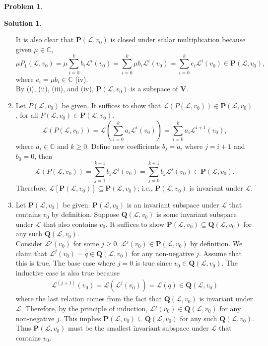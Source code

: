 \documentclass{article}
\theoremstyle{definition}
\newtheorem*{prob*}{Problem}
\newtheorem*{sln*}{Solution}
\newcommand{\V}{\mathbf{V}}
\newcommand{\lag}{\mathcal{L}}
\begin{document}
\begin{prob*}
\begin{sln*}
\begin{enumerate}
			It is also clear that $\mathbf{P}(\lag,v_0)$ is closed under scalar multiplication because given $\mu\in \mathbb{C}$, $$\mu P_1(\lag,v_0) = \mu\sum_{i=0}^kb_i\lag^i(v_0) = \sum_{i=0}^k\mu b_i\lag^i(v_0) = \sum_{i=0}^ke_i\lag^i(v_0) \in \mathbf{P}(\lag,v_0),$$ where $e_i = \mu b_i \in \mathbb{C}$ (iv).\\
			
			By (i), (ii), (iii), and (iv), $\mathbf{P}(\lag,v_0)$ is a subspace of $\V$. \\
			
			
			\item Let $P(\lag,v_0)$ be given. It suffices to show that $\lag(P(\lag, v_0)) \in \mathbf{P}(\lag,v_0)$, for all $P(\lag,v_0) \in \mathbf{P}(\lag,v_0)$. $$ \lag(P(\lag,v_0)) = \lag\left( \sum_{i=0}^k a_i\lag^i(v_0) \right) = \sum_{i=0}^k a_i \lag^{i+1}(v_0),$$ where $a_i\in\mathbb{C}$ and $k\geq 0$. Define new coefficients $b_{j} = a_{i}$ where $j=i+1$ and $b_0 = 0$, then $$ \lag(P(\lag,v_0)) = \sum_{j=1}^{k+1} b_j\lag^j(v_0) = \sum_{j=0}^{k+1} b_j\lag^j(v_0) \in \mathbf{P}(\lag,v_0). $$
			Therefore, $\lag\left[\mathbf{P}(\lag,v_0) \right] \subseteq \mathbf{P}(\lag,v_0)$; i.e., $\mathbf{P}(\lag,v_0)$ is invariant under $\lag$. \\
			
			
			
			\item  Let $\mathbf{P}(\lag,v_0)$ be given. $\mathbf{P}(\lag,v_0)$ is an invariant subspace under $\lag$ that contains $v_0$ by definition. Suppose $\mathbf{Q}(\lag,v_0)$ is some invariant subspace under $\lag$ that also contains $v_0$. It suffices to show $\mathbf{P}(\lag,v_0) \subseteq \mathbf{Q}(\lag,v_0)$ for any such $\mathbf{Q}(\lag,v_0)$. \\
			
			Consider $\lag^j(v_0)$ for some $j\geq 0$. $\lag^j{(v_0)}\in \mathbf{P}(\lag,v_0)$ by definition. We claim that $\lag^j(v_0) = q\in \mathbf{Q}(\lag,v_0)$ for any non-negative $j$. Assume that this is true. The base case where $j=0$ is true since $v_0 \in \mathbf{Q}(\lag,v_0)$. The inductive case is also true because
			\begin{align*}
			\lag^{(j+1)}(v_0) = \lag(\lag^j(v_0)) = \lag(q) \in \mathbf{Q}(\lag,v_0) 
			\end{align*}
			where the last relation comes from the fact that $\mathbf{Q}(\lag,v_0)$ is invariant under $\lag$. Therefore, by the principle of induction, $\lag^j(v_0) \in \mathbf{Q}(\lag,v_0)$ for any non-negative $j$. This implies $\mathbf{P}(\lag,v_0) \subseteq \mathbf{Q}(\lag,v_0)$ for any such $\mathbf{Q}(\lag,v_0)$. Thus $\mathbf{P}(\lag,v_0)$ must be the smallest invariant subspace under $\lag$ that contains $v_0$. 
			

\end{enumerate}
\end{sln*}
\end{prob*}
\end{document}
